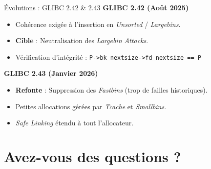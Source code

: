 \documentclass[10pt]{beamer}
\begin{document}
\begin{frame}{Évolutions : GLIBC 2.42 \& 2.43}
    \textbf{GLIBC 2.42 (Août 2025)}
    \vspace{-0.2cm}
    \begin{itemize}
        \item Cohérence exigée à l'insertion en \textit{Unsorted} / \textit{Largebins}.
        \item \textbf{Cible} : Neutralisation des \textit{Largebin Attacks}.
        \item Vérification d'intégrité : \texttt{P->bk\_nextsize->fd\_nextsize == P}
    \end{itemize}
    \vspace{0.1cm}

    \textbf{GLIBC 2.43 (Janvier 2026)}
    \vspace{-0.2cm}
    \begin{itemize}
        \item \textbf{Refonte} : Suppression des \textit{Fastbins} (trop de failles historiques).
        \item Petites allocations gérées par \textit{Tcache} et \textit{Smallbins}.
        \item \textit{Safe Linking} étendu à tout l'allocateur.
    \end{itemize}
\end{frame}

\section{Avez-vous des questions ?}
\end{document}
